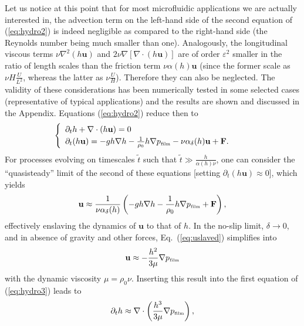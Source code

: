 Let us notice at this point that for most microfluidic applications we are actually interested in, the advection term on the left-hand side of the second equation of (\ref{eq:hydro2}) is indeed negligible as compared to the right-hand side (the Reynolds number \cite{reynoldsIIIExperimentalInvestigation1883,sommerfeldBeitrag1909} being much smaller than one).  
Analogously, the longitudinal viscous terms $\nu \nabla^2 (h\mathbf{u})$ and $2\nu \nabla [\nabla \cdot (h\mathbf{u})]$ are of order $\varepsilon^2$ smaller in the ratio of length scales than the friction term $\nu \alpha(h) \mathbf{u}$ (since the former scale as $\nu H\frac{U}{L^2}$, whereas the latter as $\nu \frac{U}{H}$).
Therefore they can also be neglected.
The validity of these considerations has been numerically tested in some selected cases (representative of typical applications) and the results are shown and discussed in the Appendix.
Equations (\ref{eq:hydro2}) reduce then to
\begin{equation}\label{eq:hydro3}
  \begin{cases}
    \begin{array}{ll}
      \partial_t h + \nabla \cdot (h \mathbf{u})  = 0 & \\ 
      \partial_t (h \mathbf{u}) = -gh \nabla h -\frac{1}{\rho_0}h\nabla p_{\mbox{\tiny{film}}}
      - \nu \alpha_{\delta}(h) \mathbf{u} + \mathbf{F}. 
     \end{array}
   \end{cases}
\end{equation}
For processes evolving on timescales $\tilde{t}$ such that $\tilde{t}\gg \frac{h}{\alpha(h)\nu}$, one can consider the ``quasisteady'' limit of the second of these equations [setting $\partial_t (h\mathbf{u}) \approx 0$], which yields
\begin{equation}\label{eq:uslaved}
  \mathbf{u} \approx \frac{1}{\nu \alpha_{\delta}(h)}\left
  (-gh \nabla h -\frac{1}{\rho_0}h\nabla p_{\mbox{\tiny{film}}} + \mathbf{F}\right),
\end{equation}
effectively enslaving the dynamics of $\mathbf{u}$ to that of $h$.
In the no-slip limit, $\delta \rightarrow 0$, and in absence of gravity and other forces, Eq.~(\ref{eq:uslaved}) simplifies into
\begin{equation*}
  \mathbf{u} \approx -\frac{h^2}{3 \mu}\nabla p_{\mbox{\tiny{film}}}
\end{equation*}
with the dynamic viscosity $\mu = \rho_0 \nu$. 
Inserting this result into the first equation of (\ref{eq:hydro3}) leads to
\begin{equation*}
  \partial_t h \approx \nabla \cdot \left(\frac{h^3}{3\mu}\nabla p_{\mbox{\tiny{film}}}\right),
\end{equation*}
